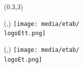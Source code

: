 \begin{textblock}{1}(0.3,3)
	\Large{}
\end{textblock}


                            

\begin{textblock}{1}(\hpostt,\vpostt)
	\texttt{[image: media/etab/\\logoEtt.png]}
\end{textblock}

\begin{textblock}{1}(\hpos,\vpos)
		\texttt{[image: media/etab/\\logoEt.png]}	
\end{textblock}

